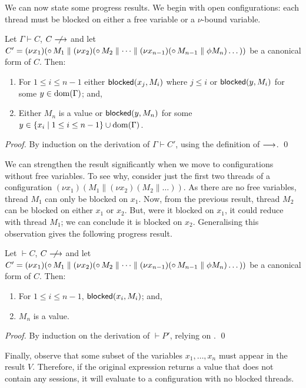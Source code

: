 \documentclass[oribibl,orivec,envcountsame]{llncs}
\begin{document}
We can now state some progress results.  We begin with open configurations: each thread must be
blocked on either a free variable or a $\nu$-bound variable.
%
\begin{theorem}\label{thm:progress-open}
  Let $\Gamma \vdash C$, $C \centernot\ceval$ and let $C' = (\nu x_1)({\mathord{\circ}}\,M_1 \parallel (\nu
  x_2)({\mathord{\circ}}\,M_2 \parallel \dots \parallel (\nu x_{n-1})({\mathord{\circ}}\,M_{n-1} \parallel \phi M_n)\dots))$ be a
  canonical form of $C$.  Then:
  \begin{enumerate}
  \item For $1 \leq i \leq n - 1$ either $\mathsf{blocked}(x_j,M_i)$ where $j \leq i$ or $\mathsf{blocked}(y,M_i)$
    for some $y \in \operatorname{dom}(\Gamma)$; and,
  \item Either $M_n$ is a value or $\mathsf{blocked}(y,M_n)$ for some $y \in \{ x_i \mid 1 \leq i \leq n -
    1 \} \cup \operatorname{dom}(\Gamma)$.
  \end{enumerate}
\end{theorem}
%
\begin{proof}
  By induction on the derivation of $\Gamma \vdash C'$, using the definition of $\longrightarrow$. \qed
\end{proof}

We can strengthen the result significantly when we move to configurations without free variables.
To see why, consider just the first two threads of a configuration $(\nu x_1)(M_1 \parallel (\nu
x_2)(M_2 \parallel \dots))$.  As there are no free variables, thread $M_1$ can only be blocked on
$x_1$.  Now, from the previous result, thread $M_2$ can be blocked on either $x_1$ or $x_2$.  But,
were it blocked on $x_1$, it could reduce with thread $M_1$; we can conclude it is blocked on $x_2$.
Generalising this observation gives the following progress result.
%
\begin{corollary}\label{thm:progress}
  Let $\vdash C$, $C \centernot\ceval$ and let $C' = (\nu x_1)({\mathord{\circ}}\,M_1 \parallel (\nu
  x_2)({\mathord{\circ}}\,M_2 \parallel \dots \parallel (\nu x_{n-1})({\mathord{\circ}}\,M_{n-1} \parallel
  \phi M_n)\dots))$ be a canonical form of $C$.  Then:
  \begin{enumerate}
  \item For $1 \leq i \leq n - 1$, $\mathsf{blocked}(x_i,M_i)$; and,
  \item $M_n$ is a value.
  \end{enumerate}
\end{corollary}
%
\begin{proof}
  By induction on the derivation of $\vdash P'$, relying on .  \qed
\end{proof}
%
Finally, observe that some subset of the variables $x_1,\dots,x_n$ must appear in the result $V$.
Therefore, if the original expression returns a value that does not contain any sessions, it will
evaluate to a configuration with no blocked threads.
\end{document}
